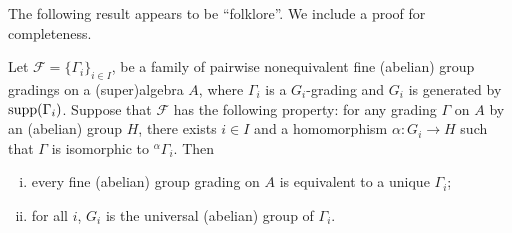 The following result appears to be ``folklore''. We include a proof for completeness.

\begin{lemma}\label{lemma:universal-grp}
	Let $\mathcal{F}=\{\Gamma_i\}_{i\in I}$, be a family of pairwise nonequivalent fine (abelian) group gradings on a (super)algebra $A$, where $\Gamma_i$ is a $G_i$-grading and $G_i$ is generated by $\operatorname{supp}(\Gamma_i)$. Suppose that $\mathcal{F}$ has the following property: 
	for any grading $\Gamma$ on $A$ by an (abelian) group $H$, there exists $i\in I$ and a homomorphism $\alpha:G_i\to H$ such that $\Gamma$ 
	is isomorphic to ${}^\alpha\Gamma_i$. Then
	\begin{enumerate}[(i)]
		\item every fine (abelian) group grading on $A$ is equivalent to a unique $\Gamma_i$;
		\item for all $i$, $G_i$ is the universal (abelian) group of $\Gamma_i$.
	\end{enumerate}
\end{lemma}

